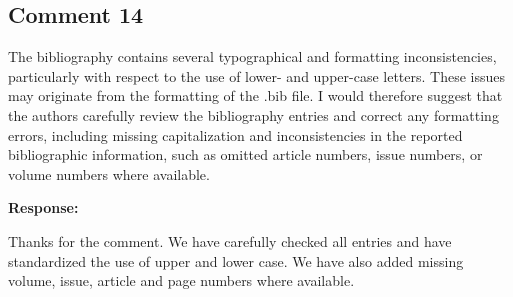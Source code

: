 \documentclass[11pt,a4paper]{article}
\newlength{\replyspace}
\newenvironment{response}{\par\addvspace{\replyspace}\nopagebreak\textbf{\textcolor{replyblue}{Response:}}\par\begingroup\color{replyblue}}{\par\endgroup\vspace{\replyspace}}
\newcommand{\refcomment}[2]{\par\Needspace{5\baselineskip}\subsection*{#1}#2\par}
\begin{document}
\refcomment{Comment 14}{
The bibliography contains several typographical and formatting inconsistencies, particularly with respect to the use of lower- and upper-case letters. These issues may originate from the formatting of the .bib file. I would therefore suggest that the authors carefully review the bibliography entries and correct any formatting errors, including missing capitalization and inconsistencies in the reported bibliographic information, such as omitted article numbers, issue numbers, or volume numbers where available.
}
\begin{response}
Thanks for the comment. We have carefully checked all entries and have standardized the use of upper and lower case. We have also added missing volume, issue, article and page numbers where available.
\end{response}



\end{document}
